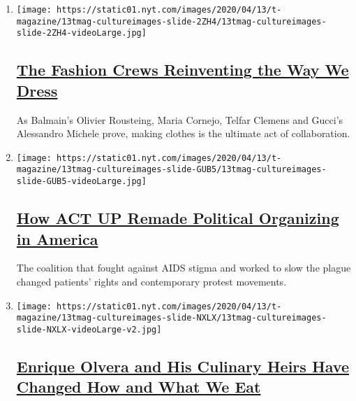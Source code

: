 \begin{enumerate}
\def\labelenumi{\arabic{enumi}.}
\item
  \texttt{[image: https://static01.nyt.com/images/2020/04/13/t-magazine/13tmag-cultureimages-slide-2ZH4/13tmag-cultureimages-slide-2ZH4-videoLarge.jpg]}

  \hypertarget{the-fashion-crews-reinventing-the-way-we-dress}{%
  \subsection{\texorpdfstring{\href{/interactive/2020/04/13/t-magazine/maria-cornejo-olivier-rousteing-telfar-clemens-alessandro-michele.html}{The
  Fashion Crews Reinventing the Way We
  Dress}}{The Fashion Crews Reinventing the Way We Dress}}\label{the-fashion-crews-reinventing-the-way-we-dress}}

  As Balmain's Olivier Rousteing, Maria Cornejo, Telfar Clemens and
  Gucci's Alessandro Michele prove, making clothes is the ultimate act
  of collaboration.
\item
  \texttt{[image: https://static01.nyt.com/images/2020/04/13/t-magazine/13tmag-cultureimages-slide-GUB5/13tmag-cultureimages-slide-GUB5-videoLarge.jpg]}

  \hypertarget{how-act-up-remade-political-organizing-in-america}{%
  \subsection{\texorpdfstring{\href{/interactive/2020/04/13/t-magazine/act-up-aids.html}{How
  ACT UP Remade Political Organizing in
  America}}{How ACT UP Remade Political Organizing in America}}\label{how-act-up-remade-political-organizing-in-america}}

  The coalition that fought against AIDS stigma and worked to slow the
  plague changed patients' rights and contemporary protest movements.
\item
  \texttt{[image: https://static01.nyt.com/images/2020/04/13/t-magazine/13tmag-cultureimages-slide-NXLX/13tmag-cultureimages-slide-NXLX-videoLarge-v2.jpg]}

  \hypertarget{enrique-olvera-and-his-culinary-heirs-have-changed-how-and-what-we-eat}{%
  \subsection{\texorpdfstring{\href{/interactive/2020/04/13/t-magazine/enrique-olvera-chef.html}{Enrique
  Olvera and His Culinary Heirs Have Changed How and What We
  Eat}}{Enrique Olvera and His Culinary Heirs Have Changed How and What We Eat}}\label{enrique-olvera-and-his-culinary-heirs-have-changed-how-and-what-we-eat}}


\end{enumerate}
